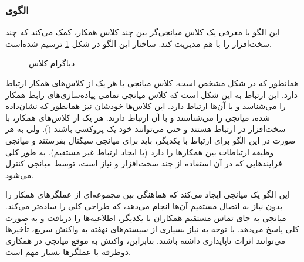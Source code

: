 \subsubsection{الگوی }
\label{HWMediatorSec}
\begin{RTL}
این الگو \cite{ref1} با معرفی یک کلاس میانجی‌گر بین چند کلاس همکار، کمک می‌کند که چند
سخت‌افزار را با هم مدیریت کند. ساختار این الگو در شکل \ref{HWMediatorClassDiag}
ترسیم شده‌است.
\end{RTL}
\begin{figure}[h!]
\centering
{}
\caption{دیاگرام کلاس }
\label{HWMediatorClassDiag}
\end{figure}
\begin{RTL}
همانطور که در شکل مشخص است، کلاس میانجی با هر یک از کلاس‌های همکار ارتباط دارد.
این ارتباط به این شکل است که کلاس میانجی تمامی پیاده‌سازی‌های رابط همکار را می‌شناسد
و با آن‌ها ارتباط دارد. این کلاس‌ها خودشان نیز همانطور که نشان‌داده شده،
میانجی را می‌شناسند و با آن ارتباط دارند.
هر یک از کلاس‌های همکار، با سخت‌افزار در ارتباط هستند و حتی می‌توانند خود یک پروکسی
باشند ().
ولی به هر صورت در این الگو برای ارتباط با یکدیگر، باید برای میانجی سیگنال
بفرستند و میانجی وظیفه ارتباطات بین همکارها را دارد (با ایجاد ارتباط غیر مستقیم).
به طور کلی فرایندهایی که در آن
استفاده از چند سخت‌افزار و نیاز است، توسط میانجی کنترل می‌شود.
\end{RTL}
\begin{RTL}
این الگو یک میانجی ایجاد می‌کند که هماهنگی بین مجموعه‌ای
از عملگرهای همکار را بدون نیاز به اتصال مستقیم آن‌ها انجام می‌دهد،
که طراحی کلی را ساده‌تر می‌کند. میانجی به جای تماس
مستقیم همکاران با یکدیگر، اطلاعیه‌ها را دریافت و به صورت
کلی پاسخ می‌دهد. با توجه به نیاز بسیاری از سیستم‌های نهفته
به واکنش سریع، تأخیرها می‌توانند اثرات ناپایداری داشته باشند.
بنابراین، واکنش به موقع میانجی در همکاری دوطرفه با
عملگرها بسیار مهم است.
\end{RTL}